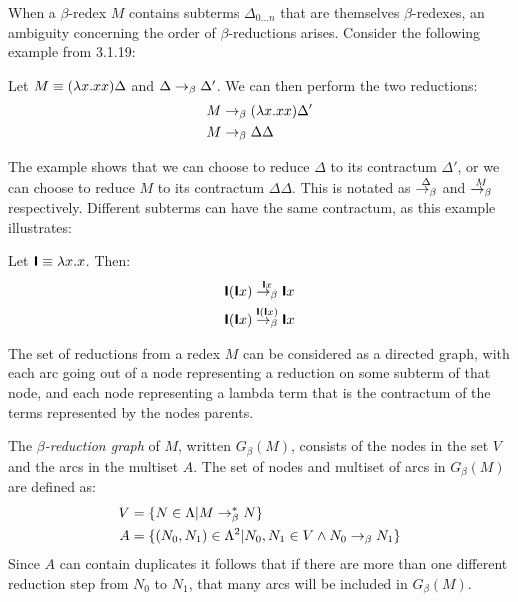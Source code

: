 When a $\beta$-redex $M$ contains subterms $\Delta_{0\hdots n}$ that are themselves 
$\beta$-redexes, an ambiguity concerning the order of $\beta$-reductions arises.
Consider the following example from \cite{Barendregt} 3.1.19:
\begin{example}
	Let $M\equiv(\lambda x.xx)\Delta$ and $\Delta\rightarrow_\beta\Delta'$. We can then perform the two reductions:
\begin{align*}
	M&\rightarrow_\beta(\lambda x.xx)\Delta' \\
	M&\rightarrow_\beta\Delta\Delta
\end{align*}
\end{example}
The example shows that we can choose to reduce $\Delta$ to its contractum $\Delta'$, or
we can choose to reduce $M$ to its contractum $\Delta\Delta$. This is notated as 
$\overset{\Delta}{\rightarrow_\beta}$ and $\overset{M}{\rightarrow_\beta}$ respectively. Different
subterms can have the same contractum, as this example illustrates:
\begin{example}
	Let $\textsf{\textbf{I}}\equiv\lambda x.x$. Then:
\begin{align*}
	\textsf{\textbf{I}}(\textsf{\textbf{I}} x)&\overset{\textsf{\textbf{I}} x}{\rightarrow_\beta}\textsf{\textbf{I}} x \\
	\textsf{\textbf{I}}(\textsf{\textbf{I}} x)&\overset{\textsf{\textbf{I}}(\textsf{\textbf{I}} x)}{\rightarrow_\beta}\textsf{\textbf{I}} x
\end{align*}
\end{example}
The set of reductions from a redex $M$ can
be considered as a directed graph, with each arc going out of a node representing
a reduction on some subterm of that node, and each node representing a lambda term that
is the contractum of the terms represented by the nodes parents.
\begin{definition}
	The \emph{$\beta$-reduction graph} of $M$, written $G_\beta(M)$, consists
	of the nodes in the set $V$ and the arcs in the multiset $A$. The set
	of nodes and multiset of arcs in $G_\beta(M)$ are defined as:
	\begin{align*}
		V&=\{N\in\Lambda|M\rightarrow_\beta^* N\} \\
		A&=\{(N_0, N_1)\in\Lambda^2|N_0,N_1\in V\wedge N_0\rightarrow_\beta N_1\}
	\end{align*}
	Since $A$ can contain duplicates it follows that if there are more than one
	different reduction step from $N_0$ to $N_1$, that many arcs will be included 
	in $G_\beta(M)$.
\end{definition}

